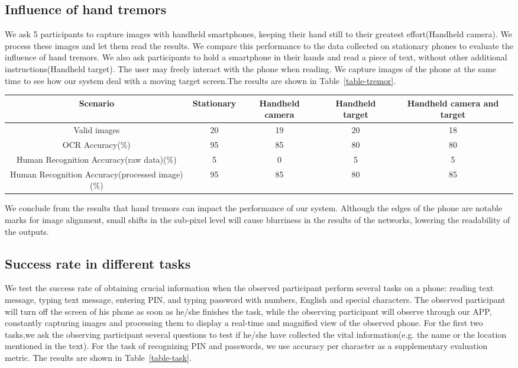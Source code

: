 \subsection{Influence of hand tremors}
We ask 5 participants to capture images with handheld smartphones, keeping their hand still to their greatest effort(Handheld camera). We process these images and let them read the results. We compare this performance to the data collected on stationary phones to evaluate the influence of hand tremors.
We also ask participants to hold a smartphone in their hands and read a piece of text, without other additional instructions(Handheld target). The user may freely interact with the phone when reading. We capture images of the phone at the same time to see how our system deal with a moving target screen.The results are shown in Table~\ref{table-tremor}.
\begin{table*}  
\begin{tabular}{c|c|c|c|c} 
Scenario &Stationary & Handheld camera & Handheld target & Handheld camera and target\\ \hline
Valid images & 20 & 19 & 20 & 18\\ \hline
OCR Accuracy(\%) & 95 & 85 & 80 & 80\\ \hline
Human Recognition Accuracy(raw data)(\%) & 5 & 0 & 5 & 5\\ \hline
Human Recognition Accuracy(processed image)(\%) & 95 & 85 & 80 & 85
\end{tabular} 
\caption{Influence of hand tremors}
\label{table-tremor}
\end{table*}

We conclude from the results that hand tremors can impact the performance of our system. Although the edges of the phone are notable marks for image alignment, small shifts in the sub-pixel level will cause blurriness in the results of the networks, lowering the readability of the outputs.

\subsection{Success rate in different tasks}
We test the success rate of obtaining crucial information when the observed participant perform several tasks on a phone: reading text message, typing text message, entering PIN, and typing password with numbers, English and special characters. The observed participant will turn off the screen of his phone as soon as he/she finishes the task, while the observing participant will observe through our APP, constantly capturing images and processing them to display a real-time and magnified view of the observed phone. For the first two tasks,we ask the observing participant several questions to test if he/she have collected the vital information(e.g. the name or the location mentioned in the text). For the task of recognizing PIN and passwords, we use accuracy per character as a supplementary evaluation metric. The results are shown in Table~\ref{table-task}.

